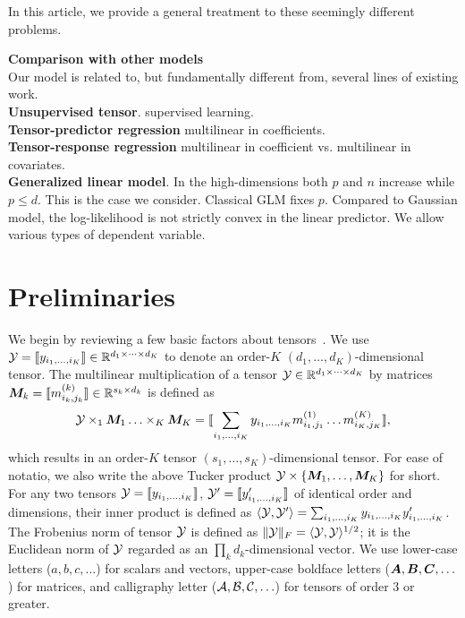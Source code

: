 \documentclass[11pt]{article}
\theoremstyle{plain}
\theoremstyle{definition}
\begin{document}
In this article, we provide a general treatment to these seemingly different problems.

{\bf Comparison with other models}\\
Our model is related to, but fundamentally different from, several lines of existing work.\\
{\bf Unsupervised tensor}. supervised learning. \\
{\bf Tensor-predictor regression} multilinear in coefficients. \\
{\bf Tensor-response regression} multilinear in coefficient vs. multilinear in covariates. \\
{\bf Generalized linear model}. In the high-dimensions both $p$ and $n$ increase while $p \leq d$. This is the case we consider. Classical GLM fixes $p$. Compared to Gaussian model, the log-likelihood is not strictly convex in the linear predictor. We allow various types of dependent variable. 



\section{Preliminaries}

We begin by reviewing a few basic factors about tensors~\cite{kolda2009tensor}. We use $\mathcal{Y}=\llbracket y_{i_1,\ldots,i_K} \rrbracket\in \mathbb{R}^{d_1\times \cdots\times d_K}$ to denote an order-$K$ $(d_1,\ldots,d_K)$-dimensional tensor. The multilinear multiplication of a tensor $\mathcal{Y}\in\mathbb{R}^{d_1\times \cdots\times d_K}$ by matrices $\bm M_k=\llbracket m_{i_k,j_k}^{(k)} \rrbracket\in\mathbb{R}^{s_k\times d_k}$ is defined as
\[
\mathcal{Y} \times_1\bm M_1\ldots \times_K \bm M_K=\llbracket \sum_{i_1,\ldots,i_K}y_{i_1,\ldots,i_K}m_{i_1,j_1}^{(1)}\ldots m_{i_K,j_K}^{(K)} \rrbracket,
\]
which results in an order-$K$ tensor $(s_1,\ldots,s_K)$-dimensional tensor. For ease of notatio, we also write the above Tucker product $\mathcal{Y}\times\{\bm M_1,\ldots,\bm M_K\}$ for short. For any two tensors $\mathcal{Y}=\llbracket y_{i_1,\ldots,i_K} \rrbracket$, $\mathcal{Y}'=\llbracket y'_{i_1,\ldots,i_K} \rrbracket$ of identical order and dimensions, their inner product is defined as $\langle \mathcal{Y}, \mathcal{Y}'\rangle =\sum_{i_1,\ldots,i_K}y_{i_1,\ldots,i_K}y'_{i_1,\ldots,i_K}$. The Frobenius norm of tensor $\mathcal{Y}$ is defined as $\lVert\mathcal{Y}\rVert_F=\langle \mathcal{Y}, \mathcal{Y} \rangle^{1/2}$; it is the Euclidean norm of $\mathcal{Y}$ regarded as an $\prod_k d_k$-dimensional vector. We use lower-case letters ($a,b,c,\ldots$) for scalars and vectors, upper-case boldface letters ($\bm A,\bm B,\bm C,\ldots$) for matrices, and calligraphy letter ($\mathcal{A}, \mathcal{B}, \mathcal{C},\ldots$) for tensors of order 3 or greater. 
\end{document}
